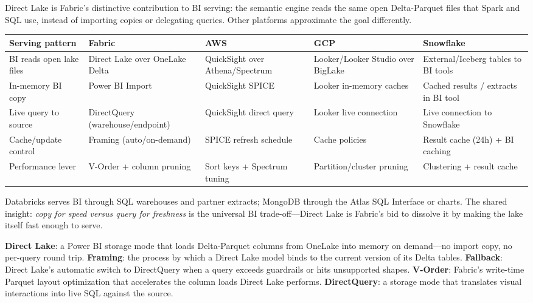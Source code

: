 \begin{crosscloud}
Direct Lake is Fabric's distinctive contribution to BI serving: the semantic engine reads the same open Delta-Parquet files that Spark and SQL use, instead of importing copies or delegating queries. Other platforms approximate the goal differently.

\vspace{2mm}
{\footnotesize
\begin{tabular}{@{}p{2.8cm}p{3.2cm}p{3.2cm}p{3.2cm}p{3.2cm}@{}}
\toprule
\textbf{Serving pattern} & \textbf{Fabric} & \textbf{AWS} & \textbf{GCP} & \textbf{Snowflake} \\
\midrule
BI reads open lake files & Direct Lake over OneLake Delta & QuickSight over Athena/Spectrum & Looker/Looker Studio over BigLake & External/Iceberg tables to BI tools \\
In-memory BI copy & Power BI Import & QuickSight SPICE & Looker in-memory caches & Cached results / extracts in BI tool \\
Live query to source & DirectQuery (warehouse/endpoint) & QuickSight direct query & Looker live connection & Live connection to Snowflake \\
Cache/update control & Framing (auto/on-demand) & SPICE refresh schedule & Cache policies & Result cache (24h) + BI caching \\
Performance lever & V-Order + column pruning & Sort keys + Spectrum tuning & Partition/cluster pruning & Clustering + result cache \\
\bottomrule
\end{tabular}}

\vspace{1mm}
Databricks serves BI through SQL warehouses and partner extracts; MongoDB through the Atlas SQL Interface or charts. The shared insight: \emph{copy for speed versus query for freshness} is the universal BI trade-off---Direct Lake is Fabric's bid to dissolve it by making the lake itself fast enough to serve.
\end{crosscloud}

\begin{keyterms}
\textbf{Direct Lake}: a Power BI storage mode that loads Delta-Parquet columns from OneLake into memory on demand---no import copy, no per-query round trip. \quad
\textbf{Framing}: the process by which a Direct Lake model binds to the current version of its Delta tables. \quad
\textbf{Fallback}: Direct Lake's automatic switch to DirectQuery when a query exceeds guardrails or hits unsupported shapes. \quad
\textbf{V-Order}: Fabric's write-time Parquet layout optimization that accelerates the column loads Direct Lake performs. \quad
\textbf{DirectQuery}: a storage mode that translates visual interactions into live SQL against the source.
\end{keyterms}

